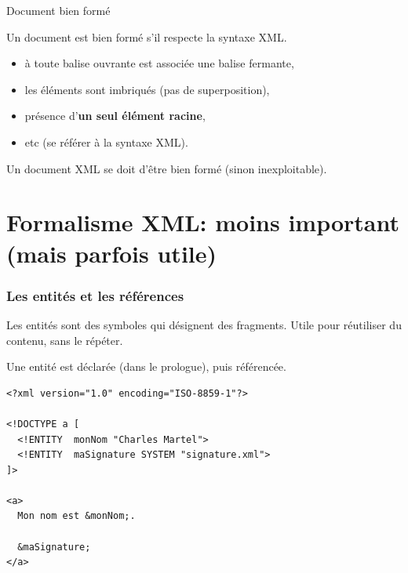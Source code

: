 \begin{frame}{Document bien formé}

Un document est bien formé s'il respecte la syntaxe XML. 


\begin{itemize}
\item \`a toute balise ouvrante est associée une balise fermante,
\item les éléments sont imbriqués (pas de superposition), 

\item présence d'\textbf{un seul élément racine},
\item etc  (se référer \`a la syntaxe XML).
\end{itemize}


Un document XML se doit d'être bien formé (sinon inexploitable).

\vfill
{}

 \end{frame}


\section{Formalisme XML: moins important (mais parfois utile)}



\begin{frame}[fragile]
\frametitle{Les entités et les références}

Les entités sont des symboles qui désignent des fragments. Utile pour réutiliser
du contenu, sans le répéter.

\vfill

Une entité est \alert{déclarée} (dans le prologue), puis \alert{référencée}.
 
\begin{lstlisting}[language=myXML]
<?xml version="1.0" encoding="ISO-8859-1"?>

<!DOCTYPE a [
  <!ENTITY  monNom "Charles Martel">
  <!ENTITY  maSignature SYSTEM "signature.xml">
]>

<a>
  Mon nom est &monNom;.

  &maSignature;
</a>
\end{lstlisting}

\end{frame}

